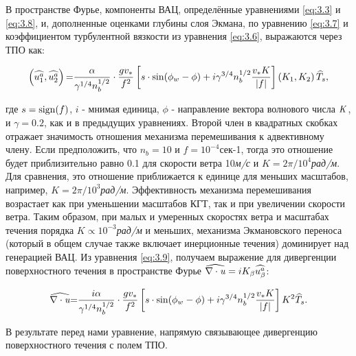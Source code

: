 {В пространстве Фурье, компоненты ВАЦ, определённые уравнениями \eqref{eq:3.3} и \eqref{eq:3.8}, и, дополненные оценками глубины слоя Экмана, по уравнению \eqref{eq:3.7} и коэффициентом турбулентной вязкости из уравнения \eqref{eq:3.6}, выражаются через ТПО как:



\begin{equation} \label{eq:3.9} \left(\widehat{u_{1}^{a} },\widehat{u_{2}^{a} }\right){\rm =}\frac{\alpha }{\gamma ^{1/4} n_{b}^{1/2} } \cdot \frac{gv_{*} }{f^{2} } \left[s\cdot \sin (\phi _{w} -\phi )+i\gamma ^{3/4} n_{b}^{1/2} \frac{v_{*} K}{\left|f\right|} \right]\left(K_{1} ,K_{2} \right)\widehat{T}_{s} ,  \end{equation} 



\noindent где $s={\rm sign}(f)$, $i$ - мнимая единица, $\phi $ - направление вектора волнового числа ${\it K}$, и $\gamma =0.2$, как и в предыдущих уравнениях. Второй член в квадратных скобках отражает значимость отношения механизма перемешивания к адвективному члену. Если предположить, что $n_{b} =10$ и $f=10^{-4} $сек-1, тогда это отношение будет приблизительно равно 0.1 для скорости ветра 10\textit{м/с} и $K=2\pi /10^{4} $\textit{рад/м}. Для сравнения, это отношение приближается к единице для меньших масштабов, например, $K=2\pi /10^{3} $\textit{рад/м}. Эффективность механизма перемешивания возрастает как при уменьшении масштабов КГТ, так и при увеличении скорости ветра. Таким образом, при малых и умеренных скоростях ветра и масштабах течения порядка $K\propto 10^{-3} $\textit{рад/м} и меньших, механизма Экмановского переноса (который в общем случае также включает инерционные течения) доминирует над генерацией ВАЦ. Из уравнения \eqref{eq:3.9}, получаем выражение для дивергенции поверхностного течения в пространстве Фурье $\widehat{\nabla \cdot {\it u}}=iK_{\beta } \widehat{u_{\beta }^{a} }$:



\begin{equation} \label{eq:3.10} \widehat{\nabla \cdot {\it u}}{\rm =}\frac{i\alpha }{\gamma ^{1/4} n_{b}^{1/2} } \cdot \frac{gv_{*} }{f^{2} } \left[s\cdot \sin (\phi _{w} -\phi )+i\gamma ^{3/4} n_{b}^{1/2} \frac{v_{*} K}{\left|f\right|} \right]K^{2} \widehat{T}_{s} .  \end{equation} 



В результате перед нами уравнение, напрямую связывающее дивергенцию поверхностного течения с полем ТПО.



}
